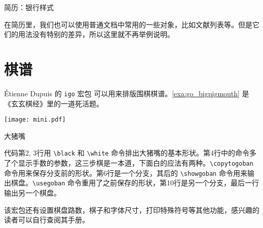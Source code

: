 \begin{example}[htbp]
\begin{Demo}
\centering
{}
\end{Demo}
\caption{简历：银行样式}
\label{exa:cv_banking}
\end{example}

在简历里，我们也可以使用普通文档中常用的一些对象，比如文献列表等。但是它们的用法没有特别的差异，所以这里就不再举例说明。

\section{棋谱}

Étienne Dupuis \indexDupuis 的 \texttt{igo} 宏包 \citep{Dupuis_igo} 可以用来排版围棋棋谱。\autoref{exa:go_bigpigmouth} 是《玄玄棋经》里的一道死活题。

\begin{example}[htbp]
\begin{FBTDemo}[numbers=left]{
\centering
\texttt{[image: mini.pdf]}
}
\usepackage{igo}
\showgoban
\quad
{}
\showgoban
\end{FBTDemo}
\caption{大猪嘴}
\label{exa:go_bigpigmouth}
\end{example}

代码第2, 3行用 \verb|\black| 和 \verb|\white| 命令排出大猪嘴的基本形状。第4行中的命令多了个显示手数的参数，这三步棋是一本道，下面白的应法有两种。\verb|\copytogoban| 命令用来保存分支前的形状。第6行是一个分支，其后的 \verb|\showgoban| 命令用来输出棋盘。\verb|\usegoban| 命令重用了之前保存的形状，第10行是另一个分支，最后一行输出另一个棋盘。

该宏包还有设置棋盘路数，棋子和字体尺寸，打印特殊符号等其他功能，感兴趣的读者可以自行查阅其手册。



